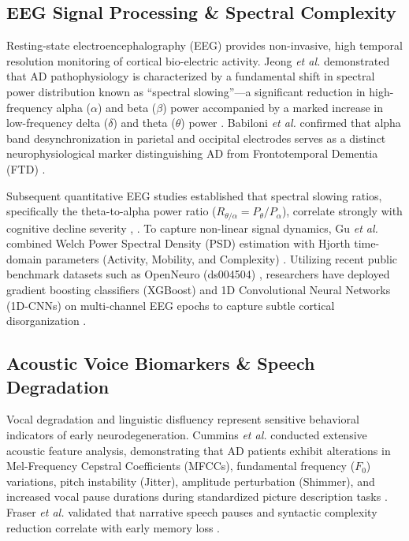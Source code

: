 \documentclass[conference]{IEEEtran}
\begin{document}
\subsection{EEG Signal Processing \& Spectral Complexity}
Resting-state electroencephalography (EEG) provides non-invasive, high temporal resolution monitoring of cortical bio-electric activity. Jeong \textit{et al.} demonstrated that AD pathophysiology is characterized by a fundamental shift in spectral power distribution known as ``spectral slowing''---a significant reduction in high-frequency alpha ($\alpha$) and beta ($\beta$) power accompanied by a marked increase in low-frequency delta ($\delta$) and theta ($\theta$) power \cite{jeong2004}. Babiloni \textit{et al.} confirmed that alpha band desynchronization in parietal and occipital electrodes serves as a distinct neurophysiological marker distinguishing AD from Frontotemporal Dementia (FTD) \cite{babiloni2014}. 

Subsequent quantitative EEG studies established that spectral slowing ratios, specifically the theta-to-alpha power ratio ($R_{\theta/\alpha} = P_\theta / P_\alpha$), correlate strongly with cognitive decline severity \cite{blackburn2018}, \cite{horvath2018}. To capture non-linear signal dynamics, Gu \textit{et al.} combined Welch Power Spectral Density (PSD) estimation with Hjorth time-domain parameters (Activity, Mobility, and Complexity) \cite{gu2021}. Utilizing recent public benchmark datasets such as OpenNeuro (ds004504) \cite{miltiadous2023}, researchers have deployed gradient boosting classifiers (XGBoost) and 1D Convolutional Neural Networks (1D-CNNs) on multi-channel EEG epochs to capture subtle cortical disorganization \cite{cassani2018}.

\subsection{Acoustic Voice Biomarkers \& Speech Degradation}
Vocal degradation and linguistic disfluency represent sensitive behavioral indicators of early neurodegeneration. Cummins \textit{et al.} conducted extensive acoustic feature analysis, demonstrating that AD patients exhibit alterations in Mel-Frequency Cepstral Coefficients (MFCCs), fundamental frequency ($F_0$) variations, pitch instability (Jitter), amplitude perturbation (Shimmer), and increased vocal pause durations during standardized picture description tasks \cite{cummins2020}. Fraser \textit{et al.} validated that narrative speech pauses and syntactic complexity reduction correlate with early memory loss \cite{fraser2016}. 
\end{document}
